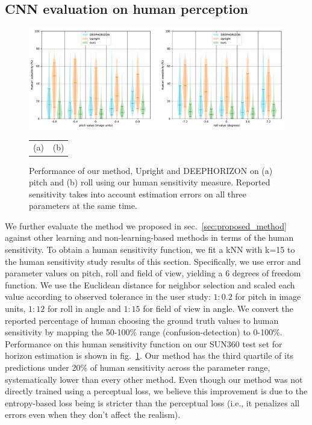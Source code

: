 \subsection{CNN evaluation on human perception}
\label{sec:cnn-evaluation-perception}

\begin{figure}
\centering
\includegraphics[width=\linewidth]{figures/method/human_sensitivity_performance_SUN360.pdf}
\begin{tabular}{p{0.5\linewidth}p{0.5\linewidth}}
\hspace{1.5cm}(a) & \hspace{1.3cm}(b)
\end{tabular}
\caption[Performance on human sensitivity measure]{Performance of our method, Upright and DEEPHORIZON on (a) pitch and (b) roll using our human sensitivity measure. Reported sensitivity takes into account estimation errors on all three parameters at the same time.}
\label{fig:method_human_performance}
\end{figure}


We further evaluate the method we proposed in sec.~\ref{sec:proposed_method} against other learning and non-learning-based methods in terms of the human sensitivity. To obtain a human sensitivity function, we fit a kNN with k=15 to the human sensitivity study results of this section. Specifically, we use error and parameter values on pitch, roll and field of view, yielding a 6 degrees of freedom function. We use the Euclidean distance for neighbor selection and scaled each value according to observed tolerance in the user study: $1{:}0.2$ for pitch in image units, $1{:}12$ for roll in angle and $1{:}15$ for field of view in angle. We convert the reported percentage of human choosing the ground truth values to human sensitivity by mapping the 50-100\% range (confusion-detection) to 0-100\%. Performance on this human sensitivity function on our SUN360 test set for horizon estimation is shown in fig.~\ref{fig:method_human_performance}. Our method has the third quartile of its predictions under 20\% of human sensitivity across the parameter range, systematically lower than every other method. Even though our method was not directly trained using a perceptual loss, we believe this improvement is due to the entropy-based loss being is stricter than the perceptual loss (i.e., it penalizes all errors even when they don't affect the realism).

